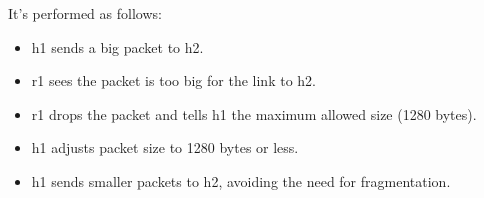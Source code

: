 It's performed as follows:
\begin{itemize}
    \item h1 sends a big packet to h2.
    \item r1 sees the packet is too big for the link to h2.
    \item r1 drops the packet and tells h1 the maximum allowed size (1280 bytes).
    \item h1 adjusts packet size to 1280 bytes or less.
    \item h1 sends smaller packets to h2, avoiding the need for fragmentation.
\end{itemize}